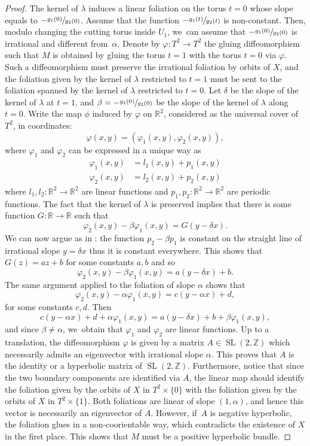 \documentclass[11pt]{article}
\DeclareMathOperator{\SL}{SL}
\theoremstyle{definition}
\begin{document}
\begin{proof}
The kernel of $\lambda$ induces a linear foliation on the torus $t=0$ whose slope equals to $-\sfrac{g_1(0)}{g_2(0)}$. Assume that the function $-\sfrac{g_1(t)}{g_2(t)}$ is non-constant. Then, modulo changing the cutting torus inside $U_1$, we~can assume that $-\sfrac{g_1(0)}{g_2(0)}$ is irrational and different from~$\alpha$. Denote by $\varphi:T^2 \to T^2 $
the gluing diffeomorphism such that $M$ is obtained by gluing the torus $t=1$ with the torus $t=0$ via $\varphi$. Such a diffeomorphism must preserve the irrational foliation by orbits of $X$, and the foliation given by the kernel of $\lambda$ restricted to $t=1$ must be sent to the foliation spanned by the kernel of $\lambda$ restricted to $t=0$. Let $\delta$ be the slope of the kernel of $\lambda$ at $t=1$, and $\beta=-\sfrac{g_1(0)}{g_2(0)}$ be the slope of the kernel of $\lambda$ along $t=0$. Write the map $\phi$ induced by $\varphi$ on $\mathbb{R}^2$, considered as the universal cover of $T^2$, in coordinates:
\[
\varphi(x,y)= (\varphi_1(x,y), \varphi_2(x,y)),
\]
where $\varphi_1$ and $\varphi_2$ can be expressed in a unique way as
\begin{align*}
\varphi_1(x,y)&=l_1(x,y)+p_1(x,y)\\
\varphi_2(x,y)&=l_2(x,y)+p_2(x,y)
\end{align*}
where $l_1,l_2:\mathbb{R}^2\to \mathbb{R}^2$ are linear functions and $p_1,p_2:\mathbb{R}^2\to \mathbb{R}^2$ are periodic functions. The fact that the kernel of $\lambda$ is preserved implies that there is some function $G:\mathbb{R}\to \mathbb{R}$ such that
\[
\varphi_2(x,y)-\beta \varphi_1(x,y)=G(y-\delta x).
\]
We can now argue as in \cite[Lem.\,4.4]{Re}: the function $p_2-\beta p_1$ is constant on the straight line of irrational slope $y=\delta x$ thus it is constant everywhere. This shows that $G(z)=az+b$ for some constants $a,b$ and so
\[
\varphi_2(x,y)-\beta \varphi_1(x,y)=a(y-\delta x)+b.
\]
The same argument applied to the foliation of slope $\alpha$ shows that
\[
\varphi_2(x,y)-\alpha \varphi_1(x,y)=c(y-\alpha x)+d,
\]
for some constants $c,d$. Then
\[
c(y-\alpha x)+d+\alpha \varphi_1(x,y)= a(y-\delta x)+b+\beta \varphi_1(x,y),
\]
and since $\beta\neq \alpha$, we~obtain that $\varphi_1$ and $\varphi_2$ are linear functions. Up to a translation, the diffeomorphism $\varphi$ is given by a matrix $A \in \SL(2,\mathbb{Z})$ which necessarily admits an eigenvector with irrational slope $\alpha$. This proves that $A$ is the identity or a hyperbolic matrix of $\SL(2,\mathbb{Z})$. Furthermore, notice that since the two boundary components are identified via $A$, the linear map should identify the foliation given by the orbits of $X$ in $T^2\times \{0\}$ with the foliation given by the orbits of $X$ in $T^2\times \{1\}$. Both foliations are linear of slope $(1,\alpha)$, and hence this vector is necessarily an eigenvector of $A$. However, if~$A$ is negative hyperbolic, the foliation glues in a non-coorientable way, which contradicts the existence of $X$ in the first place. This shows that $M$ must be a positive hyperbolic bundle.


\end{proof}
\end{document}
